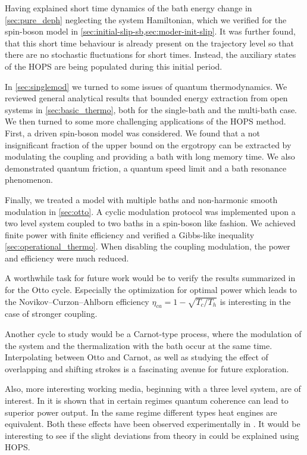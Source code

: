 Having explained short time dynamics of the bath energy change in
\cref{sec:pure_deph} neglecting the system Hamiltonian, which we
verified for the spin-boson model in
\cref{sec:initial-slip-sb,sec:moder-init-slip}. It was further found,
that this short time behaviour is already present on the trajectory
level so that there are no stochastic fluctuations for short
times. Instead, the auxiliary states of the HOPS are being populated
during this initial period.

In \cref{sec:singlemod} we turned to some issues of quantum
thermodynamics. We reviewed general analytical results that bounded
energy extraction from open systems in \cref{sec:basic_thermo}, both
for the single-bath and the multi-bath case. We then turned to some
more challenging applications of the HOPS method. First, a driven
spin-boson model was considered. We found that a not insignificant
fraction of the upper bound on the ergotropy can be extracted by
modulating the coupling and providing a bath with long memory time. We
also demonstrated quantum friction, a quantum speed limit and a bath
resonance phenomenon.

Finally, we treated a model with multiple baths and non-harmonic
smooth modulation in \cref{sec:otto}. A cyclic modulation protocol was
implemented upon a two level system coupled to two baths in a
spin-boson like fashion. We achieved finite power with finite
efficiency and verified a Gibbs-like inequality
\cref{sec:operational_thermo}. When disabling the coupling modulation,
the power and efficiency were much reduced.

A worthwhile task for future work would be to verify the results
summarized in  for the Otto cycle. Especially the
optimization for optimal power which leads to the
Novikov–Curzon–Ahlborn efficiency \(η_{ca}=1-\sqrt{T_{c}/T_{h}}\) is
interesting in the case of stronger coupling.

Another cycle to study would be a Carnot-type process, where the
modulation of the system and the thermalization with the bath occur at
the same time. Interpolating between Otto and Carnot, as well as
studying the effect of overlapping and shifting strokes is a
fascinating avenue for future exploration.

Also, more interesting working media, beginning with a three level
system, are of interest. In  it is shown that
in certain regimes quantum coherence can lead to superior power
output. In the same regime different types heat engines are
equivalent. Both these effects have been observed experimentally in
. It would be interesting to see if the slight
deviations from theory in \cite{Klatzow2019Mar} could be explained
using HOPS.

